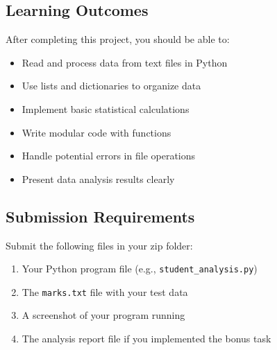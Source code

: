 \documentclass[a4paper,11pt]{article}
\theoremstyle{mytheor}
\begin{document}
\subsection*{Learning Outcomes}

After completing this project, you should be able to:

\begin{itemize}
    \item Read and process data from text files in Python
    \item Use lists and dictionaries to organize data
    \item Implement basic statistical calculations
    \item Write modular code with functions
    \item Handle potential errors in file operations
    \item Present data analysis results clearly
\end{itemize}

\subsection*{Submission Requirements}

Submit the following files in your zip folder:

\begin{enumerate}
    \item Your Python program file (e.g., \texttt{student\_analysis.py})
    \item The \texttt{marks.txt} file with your test data
    \item A screenshot of your program running
    \item The analysis report file if you implemented the bonus task
\end{enumerate}
\end{document}
